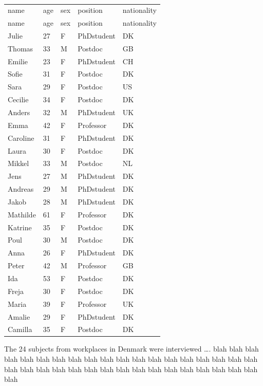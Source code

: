 \documentclass[
  a4paper,
]{scrbook}
\begin{document}
\begin{longtable}[]{@{}lllll@{}}

\caption{\label{tbl-subjects}People included in the analysis.}

\tabularnewline

\caption{}\label{T_41cb9}\tabularnewline
\toprule\noalign{}
name & age & sex & position & nationality \\
\midrule\noalign{}
\endfirsthead
\toprule\noalign{}
name & age & sex & position & nationality \\
\midrule\noalign{}
\endhead
\bottomrule\noalign{}
\endlastfoot
Julie & 27 & F & PhDstudent & DK \\
Thomas & 33 & M & Postdoc & GB \\
Emilie & 23 & F & PhDstudent & CH \\
Sofie & 31 & F & Postdoc & DK \\
Sara & 29 & F & Postdoc & US \\
Cecilie & 34 & F & Postdoc & DK \\
Anders & 32 & M & PhDstudent & UK \\
Emma & 42 & F & Professor & DK \\
Caroline & 31 & F & PhDstudent & DK \\
Laura & 30 & F & Postdoc & DK \\
Mikkel & 33 & M & Postdoc & NL \\
Jens & 27 & M & PhDstudent & DK \\
Andreas & 29 & M & PhDstudent & DK \\
Jakob & 28 & M & PhDstudent & DK \\
Mathilde & 61 & F & Professor & DK \\
Katrine & 35 & F & Postdoc & DK \\
Poul & 30 & M & Postdoc & DK \\
Anna & 26 & F & PhDstudent & DK \\
Peter & 42 & M & Professor & GB \\
Ida & 53 & F & Postdoc & DK \\
Freja & 30 & F & Postdoc & DK \\
Maria & 39 & F & Professor & UK \\
Amalie & 29 & F & PhDstudent & DK \\
Camilla & 35 & F & Postdoc & DK \\

\end{longtable}

\label{doc-sampling}
The 24 subjects from workplaces in Denmark were interviewed \ldots. blah
blah blah blah blah blah blah blah blah blah blah blah blah blah blah
blah blah blah blah blah blah blah blah blah blah blah blah blah blah
blah blah blah blah blah blah blah
\end{document}
